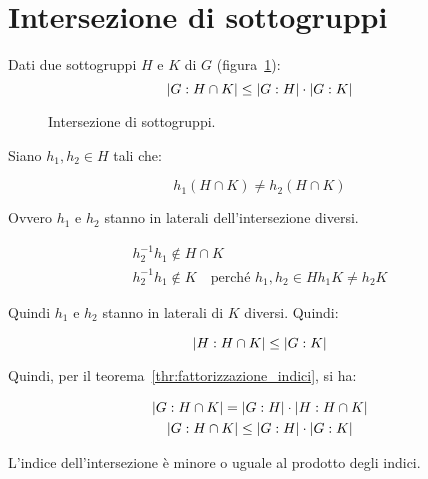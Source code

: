 \section{Intersezione di sottogruppi}
\label{sec:laterali_intersezione_sottogruppi}

\begin{esercizio}
	Dati due sottogruppi $H$ e $K$ di $G$ (figura~\ref{fig:Laterali_intersezione_di_sottogruppi}):
	\begin{equation*}
		\lvert G:H \cap K \rvert \le \lvert G:H \rvert \cdot \lvert G:K \rvert
	\end{equation*}
\end{esercizio}
\begin{figure}[tp]
	\centering
	\caption{Intersezione di sottogruppi.}
	\label{fig:Laterali_intersezione_di_sottogruppi}
\end{figure}
\begin{soluzione}
	Siano $h_1, h_2 \in H$ tali che:
	
	\begin{equation}
		h_1(H \cap K) \ne h_2(H \cap K)
	\end{equation}

	Ovvero $h_1$ e $h_2$ stanno in laterali dell'intersezione diversi.
	
	\begin{gather}
		h_2^{-1}h_1 \not\in H \cap K \\
		h_2^{-1}h_1 \not\in K \quad \text{perché } h_1, h_2 \in H
		h_1 K \ne h_2 K
	\end{gather}

	Quindi $h_1$ e $h_2$ stanno in laterali di $K$ diversi. Quindi:
	
	\begin{equation}
		\lvert H:H \cap K \rvert \le \lvert G:K \rvert
	\end{equation}

	Quindi, per il teorema~\ref{thr:fattorizzazione_indici}, si ha:
	
	\begin{gather}
		\lvert G:H \cap K \rvert = \lvert G:H \rvert \cdot \lvert H:H \cap K \rvert \\
		\lvert G:H \cap K \rvert \le \lvert G:H \rvert \cdot \lvert G:K \rvert
	\end{gather}

	L'indice dell'intersezione è minore o uguale al prodotto degli indici.
\end{soluzione}


